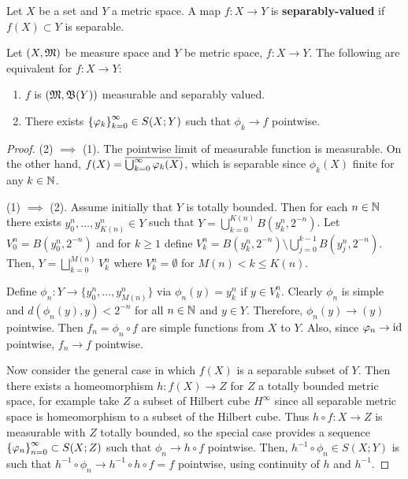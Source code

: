 \documentclass[a4paper]{article}
\begin{document}
\begin{defi}
Let $X$ be a set and $Y$ a metric space. A map $f: X 
\to Y$ is \textbf{separably-valued} 
if $f(X) \subset Y$ is separable.
\end{defi}

\begin{thm}
  Let $(X, \mathfrak{M})$ be measure space and $Y$ be metric space, 
  $f : X \to Y$. The following are equivalent for 
  $f: X \to Y$: 
  \begin{enumerate}
    \item $f$ is $(\mathfrak{M}, \mathfrak{B}(Y))$ measurable and 
    separably valued.
    \item There exists $\left\{ \varphi_k \right\}_{k=0}^\infty \in S(X; Y)$
    such that $\phi_k \to f$ pointwise.
  \end{enumerate}
\end{thm}

\begin{proof}

(2) $\implies$ (1). The pointwise limit of measurable function 
is measurable. On the other hand, $f(X) = \overline{\bigcup_{k=0}^\infty \varphi_k(X)}$,
which is separable since $\phi_k(X)$ finite for any $k \in \mathbb{N}$.

(1) $\implies$ (2). Assume initially that $Y$ is totally bounded.
Then for each $n \in \mathbb{N}$ there exists $y^n_0, \dots, y^n_{K(n)} \in Y$
such that $Y = \bigcup_{k=0}^{K(n)} B(y^n_k, 2^{-n})$. 
Let $V^n_0 = B(y_0^n, 2^{-n})$ and for $k \geq 1$ define
$V^n_k = B(y^n_k, 2^{-n}) \setminus \bigcup_{j=0}^{k-1} 
B(y^n_j, 2^{-n})$. Then, $Y = \bigsqcup_{k=0}^{M(n)} V_k^n$
where $V^n_k = \emptyset$ for $M(n) < k \leq K(n)$.

Define $\phi_n: Y \to \{ y_0^n, \dots, y_{M(n)}^n \}$
via $\phi_n(y) = y_k^n$ if $y \in V_k^n$. Clearly $\phi_n$
is simple and $d(\phi_n(y), y) < 2^{-n}$ for all $n \in \mathbb{N}$
and $y \in Y$. Therefore, $\phi_n(y) \to (y)$ pointwise.
Then $f_n = \phi_n \circ f$ are simple functions
from $X$ to $Y$. Also, since $\varphi_n \to \operatorname{id}$ pointwise, 
$f_n \to f$ pointwise.

Now consider the general case in which $f(X)$ is a separable
subset of $Y$. Then there exists a homeomorphism $h: f(X) 
\to Z$ for $Z$ a totally bounded metric space, for example
take $Z$ a subset of Hilbert cube $H^\infty$ since 
all separable metric space is homeomorphism to a subset of 
the Hilbert cube. Thus $h \circ f: X \to Z$ is measurable
with $Z$ totally bounded, so the special case provides 
a sequence $\left\{ \varphi_n \right\}_{n=0}^\infty \subset S(X; Z)$ such that 
$\phi_n \to h \circ f$ pointwise. Then, 
$h^{-1} \circ \phi_n \in S(X; Y)$ is such that 
$h^{-1} \circ \phi_n \to h^{-1} \circ h \circ f = f$
pointwise, using continuity of $h$ and $h^{-1}$.

\end{proof}
\end{document}
